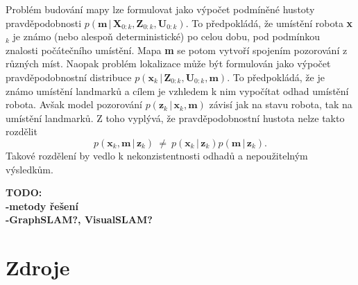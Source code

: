 \documentclass[12pt,a4paper]{article}
\begin{document}
Problém budování mapy lze formulovat jako výpočet podmíněné hustoty pravdě\-podobnosti $p(\textbf{m} \,|\, \textbf{X}_{0:k}, \textbf{Z}_{0:k}, \textbf{U}_{0:k})$. To předpokládá, že umístění robota \textbf{x}$_k$ je známo (nebo alespoň deterministické) po celou dobu, pod podmínkou znalosti počátečního umístění. Mapa \textbf{m} se potom vytvoří spojením pozorování z různých míst. Naopak problém lokalizace může být formulován jako výpočet pravděpodobnostní distribuce $p(\textbf{x}_k \,|\, \textbf{Z}_{0:k}, \textbf{U}_{0:k}, \textbf{m})$. To předpokládá, že je známo umístění landmarků a cílem je vzhledem k nim vypočítat odhad umístění robota. Avšak model pozorování $p(\textbf{z}_k \,|\, \textbf{x}_k, \textbf{m})$ závisí jak na stavu robota, tak na umístění landmarků. Z toho vyplývá, že pravděpodobnostní hustota nelze takto rozdělit
$$
p(\textbf{x}_k, \textbf{m} \,|\, \textbf{z}_k) \: \ne \: p(\textbf{x}_k \,|\, \textbf{z}_k)p(\textbf{m} \,|\, \textbf{z}_k).
$$
Takové rozdělení by vedlo k nekonzistentnosti odhadů a nepoužitelným výsledkům.


\textbf{TODO: \\
-metody řešení \\
-GraphSLAM?, VisualSLAM?} 

\section{Zdroje}
\end{document}
